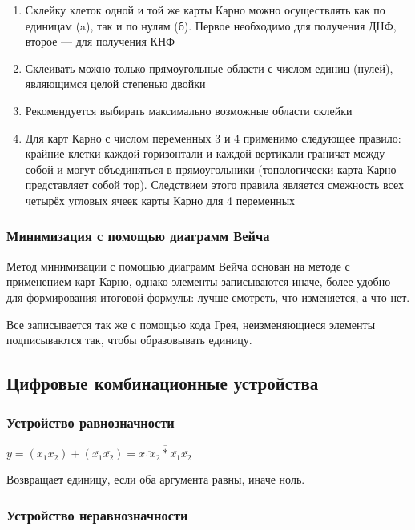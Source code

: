 \documentclass{article}
\begin{document}
\begin{enumerate}
    \item Склейку клеток одной и той же карты Карно можно осуществлять как по единицам (a), так и по нулям (б). Первое необходимо для получения ДНФ, второе — для получения КНФ
    \item Склеивать можно только прямоугольные области с числом единиц (нулей), являющимся целой степенью двойки
    \item Рекомендуется выбирать максимально возможные области склейки
    \item Для карт Карно с числом переменных 3 и 4 применимо следующее правило: крайние клетки каждой горизонтали и каждой вертикали граничат между собой и могут объединяться в прямоугольники (топологически карта Карно представляет собой тор). Следствием этого правила является смежность всех четырёх угловых ячеек карты Карно для 4 переменных
\end{enumerate}

\subsubsection{Минимизация с помощью диаграмм Вейча}

Метод минимизации с помощью диаграмм Вейча основан на методе с применением карт Карно, однако элементы записываются иначе, более удобно для формирования итоговой формулы: лучше смотреть, что изменяется, а что нет.

Все записывается так же с помощью кода Грея, неизменяющиеся элементы подписываются так, чтобы образовывать единицу.

\subsection{Цифровые комбинационные устройства}

\subsubsection{Устройство равнозначности}

$y = (x_{1}x_{2}) + (\overline{x_{1}}\overline{x_{2}}) = \overline{\overline{x_{1}x_{2}} * \overline{\overline{x_1}\overline{x_2}}}$

Возвращает единицу, если оба аргумента равны, иначе ноль.

\subsubsection{Устройство неравнозначности}
\end{document}
